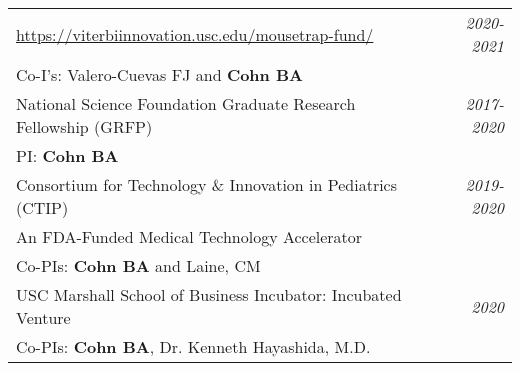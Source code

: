 \documentclass[10pt,a4paper]{article}
\begin{document}
  \vspace*{1mm}\noindent\begin{tabularx}{17cm}{X r}
    \href{USC Viterbi School of Engineering: Mousetrap Grant}{https://viterbiinnovation.usc.edu/mousetrap-fund/}  & \textit{2020-2021} \\
    Co-I's: Valero-Cuevas FJ and \textbf{Cohn BA} \\
    \vspace*{1mm}
    National Science Foundation Graduate Research Fellowship (GRFP) & \textit{2017-2020} \\
    PI: \textbf{Cohn BA} \\
    \vspace*{1mm}
    Consortium for Technology \& Innovation in Pediatrics (CTIP) & \textit{2019-2020} \\
    An FDA-Funded Medical Technology Accelerator\\
    Co-PIs: \textbf{Cohn BA} and Laine, CM \\

    \vspace*{1mm}
    USC Marshall School of Business Incubator: Incubated Venture & \textit{2020} \\
    Co-PIs: \textbf{Cohn BA}, Dr. Kenneth Hayashida, M.D. \\


  

\end{tabularx}
\end{document}
